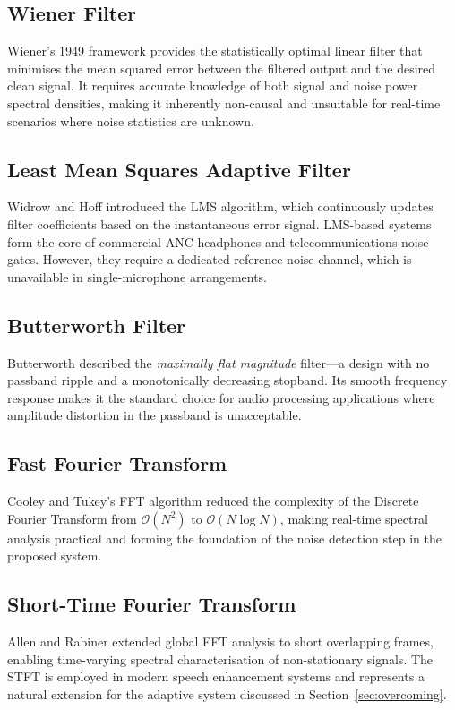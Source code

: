 \documentclass[conference]{IEEEtran}
\begin{document}
\subsection{Wiener Filter}
Wiener's 1949 framework \cite{oppenheim2009} provides the statistically
optimal linear filter that minimises the mean squared error between the
filtered output and the desired clean signal. It requires accurate knowledge
of both signal and noise power spectral densities, making it inherently
non-causal and unsuitable for real-time scenarios where noise statistics are
unknown.

\subsection{Least Mean Squares Adaptive Filter}
Widrow and Hoff \cite{widrow1960} introduced the LMS algorithm, which
continuously updates filter coefficients based on the instantaneous error
signal. LMS-based systems form the core of commercial ANC headphones and
telecommunications noise gates. However, they require a dedicated reference
noise channel, which is unavailable in single-microphone arrangements.

\subsection{Butterworth Filter}
Butterworth \cite{butterworth1930} described the \emph{maximally flat
magnitude} filter---a design with no passband ripple and a monotonically
decreasing stopband. Its smooth frequency response makes it the standard
choice for audio processing applications where amplitude distortion in the
passband is unacceptable.

\subsection{Fast Fourier Transform}
Cooley and Tukey's FFT algorithm \cite{cooley1965} reduced the complexity of
the Discrete Fourier Transform from $\mathcal{O}(N^2)$ to
$\mathcal{O}(N\log N)$, making real-time spectral analysis practical and
forming the foundation of the noise detection step in the proposed system.

\subsection{Short-Time Fourier Transform}
Allen and Rabiner \cite{allen1977} extended global FFT analysis to
short overlapping frames, enabling time-varying spectral characterisation of
non-stationary signals. The STFT is employed in modern speech enhancement
systems and represents a natural extension for the adaptive system discussed
in Section~\ref{sec:overcoming}.
\end{document}
